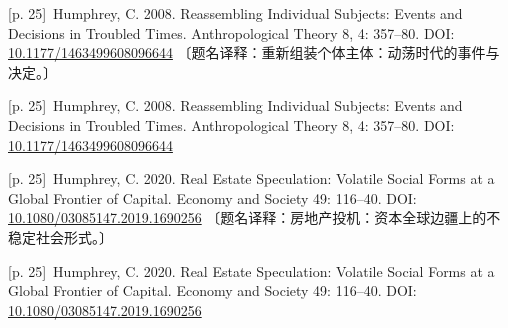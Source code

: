 \documentclass[10pt,a4paper]{article}
\begin{document}
\noindent\begin{minipage}{\textwidth}\begin{minipage}[t]{\dimexpr.5\textwidth-4mm\relax}\noindent\begin{minipage}[t]{\linewidth}{\scriptsize\color{gray} [p. 25]}\ Humphrey, C. 2008. Reassembling Individual Subjects: Events and Decisions in Troubled Times. Anthropological Theory 8, 4: 357–80. DOI: \url{10.1177/1463499608096644} 〔题名译释：重新组装个体主体：动荡时代的事件与决定。〕\par\end{minipage}\par\end{minipage}\hfill\begin{minipage}[t]{\dimexpr.5\textwidth-4mm\relax}\noindent\begin{minipage}[t]{\linewidth}{\scriptsize\color{gray} [p. 25]}\ Humphrey, C. 2008. Reassembling Individual Subjects: Events and Decisions in Troubled Times. Anthropological Theory 8, 4: 357–80. DOI: \url{10.1177/1463499608096644}\par\end{minipage}\par\end{minipage}\end{minipage}\par
\noindent\begin{minipage}{\textwidth}\begin{minipage}[t]{\dimexpr.5\textwidth-4mm\relax}\noindent\begin{minipage}[t]{\linewidth}{\scriptsize\color{gray} [p. 25]}\ Humphrey, C. 2020. Real Estate Speculation: Volatile Social Forms at a Global Frontier of Capital. Economy and Society 49: 116–40. DOI: \url{10.1080/03085147.2019.1690256} 〔题名译释：房地产投机：资本全球边疆上的不稳定社会形式。〕\par\end{minipage}\par\end{minipage}\hfill\begin{minipage}[t]{\dimexpr.5\textwidth-4mm\relax}\noindent\begin{minipage}[t]{\linewidth}{\scriptsize\color{gray} [p. 25]}\ Humphrey, C. 2020. Real Estate Speculation: Volatile Social Forms at a Global Frontier of Capital. Economy and Society 49: 116–40. DOI: \url{10.1080/03085147.2019.1690256}\par\end{minipage}\par\end{minipage}\end{minipage}\par
\end{document}
